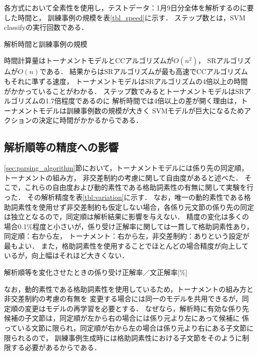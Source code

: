 \documentclass[japanese]{jnlp_1.4}
\begin{document}
各方式において全素性を使用し，テストデータ：1月9日分全体を解析するのに要した時間と，
訓練事例の規模を表\ref{tbl_speed}に示す．
ステップ数とは，SVM classifyの実行回数である．


\begin{table}[b]
\caption{解析時間と訓練事例の規模}
\begin{center}

\end{center}
\label{tbl_speed}
\end{table}

時間計算量はトーナメントモデルとCCアルゴリズムが$O(n^2)$，
SRアルゴリズムが$O(n)$である．
結果からはSRアルゴリズムが最も高速でCCアルゴリズムもそれに準ずる速度，
トーナメントモデルはSRアルゴリズムの4倍以上の時間がかかっていることがわかる．
ステップ数でみるとトーナメントモデルはSRアルゴリズムの1.7倍程度であるのに
解析時間では4倍以上の差が開く理由は，トーナメントモデルは訓練事例数の規模が大きく
SVMモデルが巨大になるためアクションの決定に時間がかかるからである．


\subsection{解析順等の精度への影響}

\ref{sec:parsing_algorithm}節において，トーナメントモデルには係り先の同定順，トーナメントの組み方，
非交差制約の考慮に関して自由度があると述べた．
そこで，これらの自由度および動的素性である格助詞素性の有無に関して実験を行った．
その解析精度を表\ref{tbl:variation}に示す．
なお，唯一の動的素性である格助詞素性を使用せず非交差制約も仮定しない場合，各係り元文節の係り先の同定は独立となるので，同定順は解析結果に影響を与えない．
精度の変化は多くの場合0.1\%程度と小さいが，係り受け正解率に関しては一貫して格助詞素性あり，同定順：右から左，
トーナメント：右から左，非交差制約：ありという設定が最もよい．
また，格助詞素性を使用することでほとんどの場合精度が向上しているが，向上幅はそれほど大きくない．

\begin{table}[b]
\caption{解析順等を変化させたときの係り受け正解率／文正解率[\%]}
\label{tbl:variation}
\begin{center}

\end{center}
\end{table}

なお，動的素性である格助詞素性を使用しているため，トーナメントの組み方と非交差制約の考慮の有無を
変更する場合には同一のモデルを共用できるが，同定順の変更はモデルの再学習を必要とする．
なぜなら，解析時に有効な係り先候補の子文節は，同定順が左から右の場合には係り元より左にあって候補に
係っている文節に限られ，同定順が右から左の場合は係り元より右にある子文節に限られるので，
訓練事例生成時には格助詞素性における子文節をそのように制限する必要があるからである．
\end{document}
